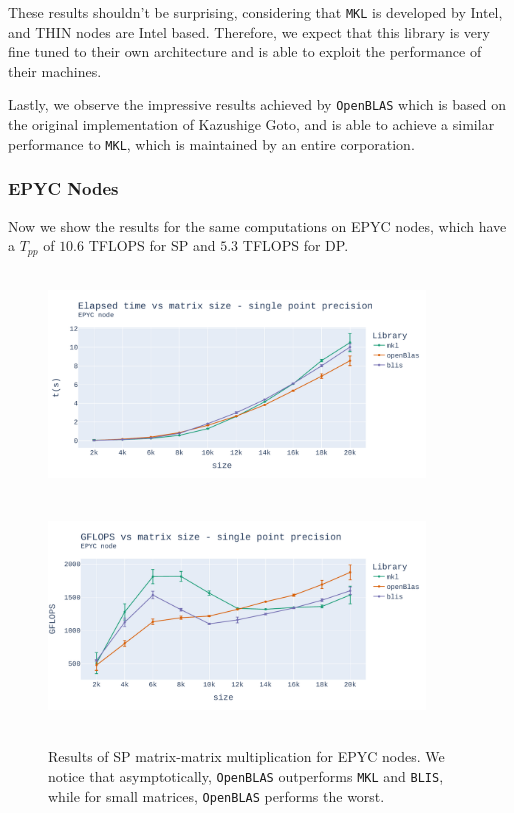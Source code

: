 \documentclass{report}
\begin{document}
These results shouldn't be surprising, considering 
that \texttt{MKL} is developed by Intel, and THIN nodes are Intel based.
Therefore, we expect that this library is very fine tuned to their own architecture 
and is able to exploit the performance of their machines.

Lastly, we observe the impressive results achieved by \texttt{OpenBLAS} which 
is based on the original implementation of Kazushige Goto, and is able to achieve a similar performance to 
\texttt{MKL}, which is maintained by an entire corporation.

\subsubsection{EPYC Nodes}

Now we show the results for the same computations on EPYC nodes, which have a 
$T_{pp}$ of $10.6$ TFLOPS for SP and $5.3$ TFLOPS for DP.

\begin{figure}[h!p]
\hspace*{-2.5cm}
\includegraphics[width=10cm, height=6cm]{./images/fixed_cores_epyc_float_time.pdf}
\includegraphics[width=10cm, height=6cm]{./images/fixed_cores_epyc_float_gflops.pdf}
\caption{\label{fig:fixed_cores_epyc_float} Results of SP matrix-matrix multiplication 
for EPYC nodes. We notice that asymptotically, \texttt{OpenBLAS} outperforms 
\texttt{MKL} and \texttt{BLIS}, while for small matrices, \texttt{OpenBLAS} 
performs the worst.}
\end{figure} 
\end{document}
